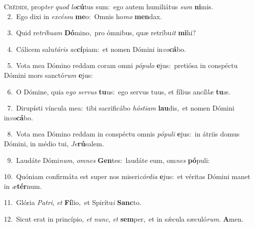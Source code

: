 \lettrine{\initial\textcolor{\initialcolor}{C}}{rédidi,} prop\textit{ter} \textit{quod} \textit{lo}\-\textbf{cú}tus sum:~\star ego autem humiliátus \textit{sum} \textbf{ni}\-mis.\\
{\numbfont\textcolor{\numbcolor}{~2.}}~Ego dixi in \textit{ex}\-\textit{cés}\textit{su} \textbf{me}\-o:~\star Omnis ho\textit{mo} \textbf{men}\-dax.\par
{\numbfont\textcolor{\numbcolor}{~3.}}~Quid re\-\textit{trí}\-\textit{bu}\textit{am} \textbf{Dó}\-mino,~\star pro ómnibus, quæ retríbu\textit{it} \textbf{mi}\-hi?\par
{\numbfont\textcolor{\numbcolor}{~4.}}~Cálicem salu\-\textit{tá}\-\textit{ris} \textit{ac}\-\textbf{cí}piam:~\star et nomen Dómini in\-\textit{vo}\-\textbf{cá}bo.\par
{\numbfont\textcolor{\numbcolor}{~5.}}~Vota mea Dómino reddam coram omni \textit{pó}\-\textit{pu}\textit{lo} \textbf{e}\-jus:~\star pretiósa in conspéctu Dómini mors sanctó\textit{rum} \textbf{e}\-jus:\par
{\numbfont\textcolor{\numbcolor}{~6.}}~O Dómine, quia e\textit{go} \textit{ser}\-\textit{vus} \textbf{tu}\-us:~\star ego servus tuus, et fílius ancíl\textit{læ} \textbf{tu}\-æ.\par
{\numbfont\textcolor{\numbcolor}{~7.}}~Dirupísti víncula mea:~\dagger tibi sacrificábo \textit{hós}\-\textit{ti}\textit{am} \textbf{lau}\-dis,~\star et nomen Dómini in\-\textit{vo}\-\textbf{cá}bo.\par
{\numbfont\textcolor{\numbcolor}{~8.}}~Vota mea Dómino reddam in conspéctu omnis \textit{pó}\-\textit{pu}\textit{li} \textbf{e}\-jus:~\star in átriis domus Dómini, in médio tui, \textit{Je}\-\textbf{rú}salem.\par
{\numbfont\textcolor{\numbcolor}{~9.}}~Laudáte Dómi\-\textit{num}\-, \textit{om}\-\textit{nes} \textbf{Gen}\-tes:~\star laudáte eum, om\textit{nes} \textbf{pó}\-puli:\par
{\numbfont\textcolor{\numbcolor}{10.}}~Quóniam confirmáta est super nos miseri\-\textit{cór}\-\textit{di}\textit{a} \textbf{e}\-jus:~\star et véritas Dómini manet in \textit{æ}\-\textbf{tér}num.\par
{\numbfont\textcolor{\numbcolor}{11.}}~Glória \textit{Pa}\-\textit{tri}, \textit{et} \textbf{Fí}\-lio,~\star et Spirítu\textit{i} \textbf{Sanc}\-to.\par
{\numbfont\textcolor{\numbcolor}{12.}}~Sicut erat in princípio, \textit{et} \textit{nunc}\-, \textit{et} \textbf{sem}\-per,~\star et in sǽcula sæculó\-\textit{rum}\-. \textbf{A}\-men.\par
